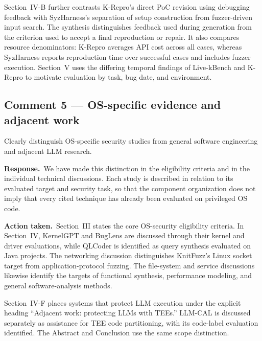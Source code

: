 \documentclass[11pt,a4paper]{article}
\newcommand{\response}{\par\textbf{Response.}\ }
\newcommand{\action}{\par\textbf{Action taken.}\ }
\begin{document}
Section~IV-B further contrasts K-Repro's direct PoC revision using debugging feedback with SyzHarness's separation of setup construction from fuzzer-driven input search. The synthesis distinguishes feedback used during generation from the criterion used to accept a final reproduction or repair. It also compares resource denominators: K-Repro averages API cost across all cases, whereas SyzHarness reports reproduction time over successful cases and includes fuzzer execution. Section~V uses the differing temporal findings of Live-kBench and K-Repro to motivate evaluation by task, bug date, and environment.

\subsection{Comment 5 --- OS-specific evidence and adjacent work}
\begin{reviewcomment}
Clearly distinguish OS-specific security studies from general software engineering and adjacent LLM research.
\end{reviewcomment}

\response We have made this distinction in the eligibility criteria and in the individual technical discussions. Each study is described in relation to its evaluated target and security task, so that the component organization does not imply that every cited technique has already been evaluated on privileged OS code.

\action Section~III states the core OS-security eligibility criteria. In Section~IV, KernelGPT and BugLens are discussed through their kernel and driver evaluations, while QLCoder is identified as query synthesis evaluated on Java projects. The networking discussion distinguishes KnitFuzz's Linux socket target from application-protocol fuzzing. The file-system and service discussions likewise identify the targets of functional synthesis, performance modeling, and general software-analysis methods.

Section~IV-F places systems that protect LLM execution under the explicit heading ``Adjacent work: protecting LLMs with TEEs.'' LLM-CAL is discussed separately as assistance for TEE code partitioning, with its code-label evaluation identified. The Abstract and Conclusion use the same scope distinction.
\end{document}
